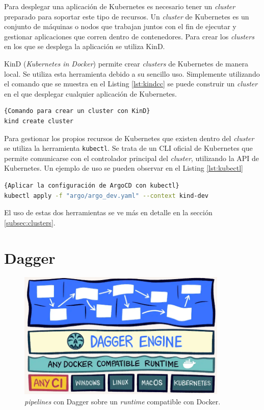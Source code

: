 Para desplegar una aplicación de Kubernetes es necesario tener un \textit{cluster} preparado para soportar este tipo de recursos. Un \textit{cluster} de Kubernetes es un conjunto de máquinas o nodos que trabajan juntos con el fin de ejecutar y gestionar aplicaciones que corren dentro de contenedores. Para crear los \textit{clusters} en los que se desplega la aplicación se utiliza KinD\cite{kind}.

KinD (\textit{Kubernetes in Docker}) permite crear \textit{clusters} de Kubernetes de manera local. Se utiliza esta herramienta debido a su sencillo uso. Simplemente utilizando el comando que se muestra en el Listing \ref{lst:kindcc} se puede construir un \textit{cluster} en el que desplegar cualquier aplicación de Kubernetes.

\begin{lstlisting}[language=bash,label=lst:kindcc]{Comando para crear un cluster con KinD}
kind create cluster
\end{lstlisting}

Para gestionar los propios recursos de Kubernetes que existen dentro del \textit{cluster} se utiliza la herramienta \texttt{kubectl}\cite{kubectl}. Se trata de un CLI oficial de Kubernetes que permite comunicarse con el controlador principal del \textit{cluster}, utilizando la API de Kubernetes. Un ejemplo de uso se pueden observar en el Listing \ref{lst:kubectl}

\begin{lstlisting}[language=bash,label=lst:kubectl]{Aplicar la configuración de ArgoCD con kubectl}
kubectl apply -f "argo/argo_dev.yaml" --context kind-dev
\end{lstlisting}

El uso de estas dos herramientas se ve más en detalle en la sección \ref{subsec:clusters}.

\section{Dagger}

\begin{figure}
  \centerline{\includegraphics[width=10cm]{figuras/dagger}}
  \caption{\textit{pipelines} con Dagger sobre un \textit{runtime} compatible con Docker.\cite{img:dagger}}
  \label{fig:dagger}
\end{figure}

